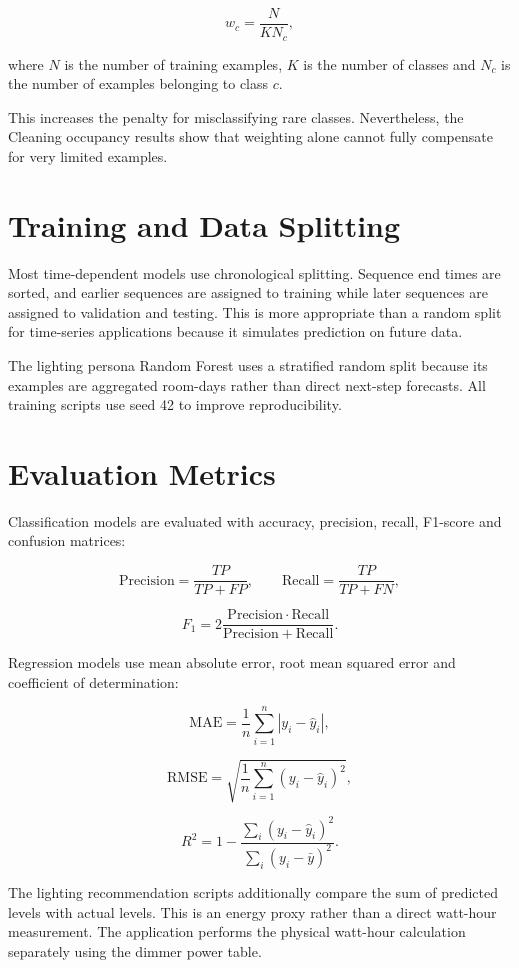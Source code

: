 \[
    w_c = \frac{N}{K N_c},
\]

where $N$ is the number of training examples, $K$ is the number of classes and
$N_c$ is the number of examples belonging to class $c$.

This increases the penalty for misclassifying rare classes. Nevertheless, the
Cleaning occupancy results show that weighting alone cannot fully compensate
for very limited examples.

\section{Training and Data Splitting}

Most time-dependent models use chronological splitting. Sequence end times are
sorted, and earlier sequences are assigned to training while later sequences
are assigned to validation and testing. This is more appropriate than a random
split for time-series applications because it simulates prediction on future
data.

The lighting persona Random Forest uses a stratified random split because its
examples are aggregated room-days rather than direct next-step forecasts. All
training scripts use seed 42 to improve reproducibility.

\section{Evaluation Metrics}

Classification models are evaluated with accuracy, precision, recall,
F1-score and confusion matrices:

\[
    \mathrm{Precision}=\frac{TP}{TP+FP},
    \qquad
    \mathrm{Recall}=\frac{TP}{TP+FN},
\]

\[
    F_1 =
    2\frac{\mathrm{Precision}\cdot\mathrm{Recall}}
    {\mathrm{Precision}+\mathrm{Recall}}.
\]

Regression models use mean absolute error, root mean squared error and
coefficient of determination:

\[
    \mathrm{MAE}=\frac{1}{n}\sum_{i=1}^{n}|y_i-\hat{y}_i|,
\]

\[
    \mathrm{RMSE}=
    \sqrt{\frac{1}{n}\sum_{i=1}^{n}(y_i-\hat{y}_i)^2},
\]

\[
    R^2 =
    1-
    \frac{\sum_i(y_i-\hat{y}_i)^2}
    {\sum_i(y_i-\bar{y})^2}.
\]

The lighting recommendation scripts additionally compare the sum of predicted
levels with actual levels. This is an energy proxy rather than a direct
watt-hour measurement. The application performs the physical watt-hour
calculation separately using the dimmer power table.


